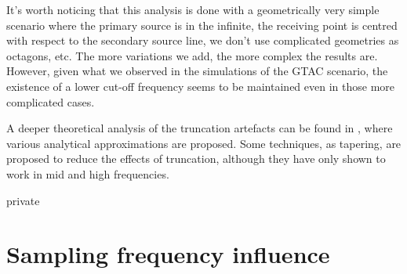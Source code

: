 It's worth noticing that this analysis is done with a geometrically very simple scenario where the primary source is in the infinite, the receiving point is centred with respect to the secondary source line, we don't use complicated geometries as octagons, etc. The more variations we add, the more complex the results are. However, given what we observed in the simulations of the GTAC scenario, the existence of a lower cut-off frequency seems to be maintained even in those more complicated cases.

A deeper theoretical analysis of the truncation artefacts can be found in \cite[Section 4.3]{Start1997}, where various analytical approximations are proposed. Some techniques, as tapering, are proposed to reduce the effects of truncation, although they have only shown to work in mid and high frequencies.

\begin{shownto}{private}
\section{Sampling frequency influence}
\end{shownto}
